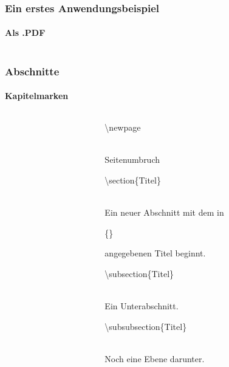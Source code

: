 \begin{frame}
\frametitle{Ein erstes Anwendungsbeispiel}
\framesubtitle{Als .PDF}
\begin{columns}
\begin{column}{0.5\textwidth}
\begin{ttfamily}\scriptsize

 \normalsize
\end{ttfamily}
\end{column}

\begin{column}{0.5\textwidth}
\end{column}
\end{columns}
\end{frame}



\begin{frame}
\frametitle{Abschnitte}
\framesubtitle{Kapitelmarken}
\begin{columns}
\begin{column}{0.5\textwidth}
\begin{ttfamily}\scriptsize

\end{ttfamily}
\end{column}
\begin{column}{0.5\textwidth}
\begin{ttfamily}\color{nounibaredI}\textbackslash newpage\color{black}\end{ttfamily}\\
Seitenumbruch\\[3mm]
\begin{ttfamily}\color{unibablueI}\textbackslash section\color{black}\{Titel\}\end{ttfamily}\\
Ein neuer Abschnitt mit dem in \begin{ttfamily}\{\}\end{ttfamily} angegebenen Titel
beginnt.\\[3mm]
\begin{ttfamily}\color{unibablueI}\textbackslash subsection\color{black}\{Titel\}\end{ttfamily}\\
Ein Unterabschnitt.\\[3mm]
\begin{ttfamily}\color{unibablueI}\textbackslash subsubsection\color{black}\{Titel\}\end{ttfamily}\\
Noch eine Ebene darunter.\\
\end{column}
\end{columns}
\end{frame}

